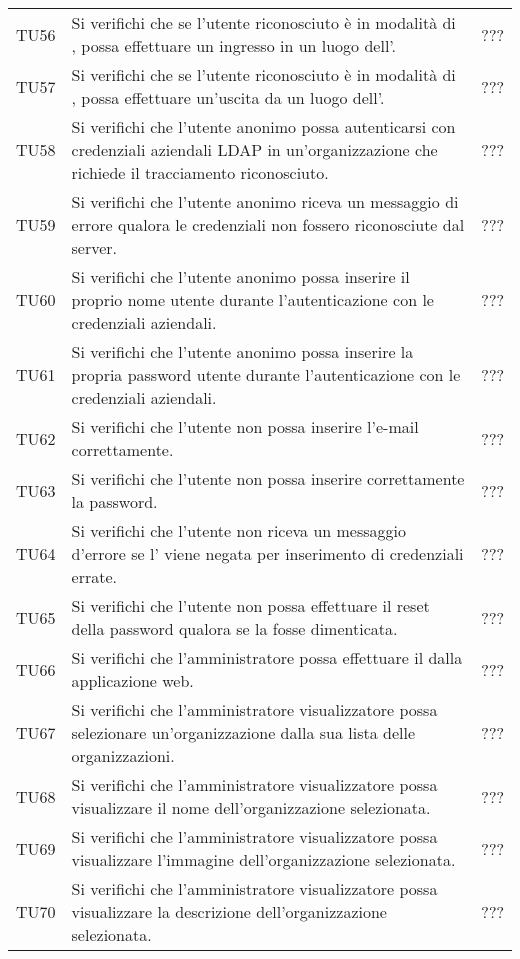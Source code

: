 {\begin{longtable}{ c C{13cm} C{1cm}}
TU56 & Si verifichi che se l'utente riconosciuto è in modalità di , possa effettuare un ingresso in un luogo dell'. & ??? \\
TU57 & Si verifichi che se l'utente riconosciuto è in modalità di , possa effettuare un'uscita da un luogo dell'. & ??? \\
TU58 & Si verifichi che l’utente anonimo possa autenticarsi con credenziali aziendali LDAP in un'organizzazione che richiede il tracciamento riconosciuto. & ??? \\
TU59 & Si verifichi che l’utente anonimo riceva un messaggio di errore qualora le credenziali  non fossero riconosciute dal server. & ??? \\
TU60 & Si verifichi che l’utente anonimo possa inserire il proprio nome utente durante l'autenticazione con le credenziali  aziendali. & ??? \\
TU61 & Si verifichi che l’utente anonimo possa inserire la propria password utente durante l'autenticazione con le credenziali  aziendali. & ??? \\
TU62 & Si verifichi che l’utente non  possa inserire l'e-mail correttamente. & ??? \\
TU63 & Si verifichi che l’utente non  possa inserire correttamente la password. & ??? \\
TU64 & Si verifichi che l’utente non  riceva un messaggio d'errore se l' viene negata per inserimento di credenziali errate. & ??? \\
TU65 & Si verifichi che l’utente non  possa effettuare il reset della password qualora se la fosse dimenticata. & ??? \\
TU66 & Si verifichi che l'amministratore  possa effettuare il  dalla applicazione web. & ??? \\
TU67 & Si verifichi che l’amministratore visualizzatore possa selezionare un’organizzazione dalla sua lista delle organizzazioni. & ??? \\
TU68 & Si verifichi che l'amministratore visualizzatore possa visualizzare il nome dell'organizzazione selezionata. & ??? \\
TU69 & Si verifichi che l'amministratore visualizzatore possa visualizzare l’immagine dell'organizzazione selezionata. & ??? \\
TU70 & Si verifichi che l'amministratore visualizzatore possa visualizzare la descrizione dell'organizzazione selezionata. & ??? \\

\end{longtable}}
